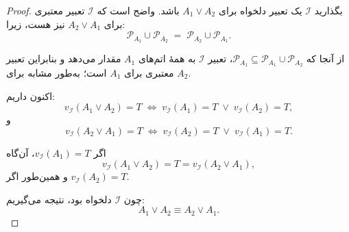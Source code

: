     \begin{proof}
      بگذارید $\mathscr{I}$ یک تعبیر دلخواه برای $A_1 \lor A_2$ باشد. واضح است که $\mathscr{I}$ تعبیر معتبری برای $A_2 \lor A_1$ نیز هست، زیرا:
      \[
      \mathscr{P}_{A_1} \cup \mathscr{P}_{A_2} \;=\; \mathscr{P}_{A_2} \cup \mathscr{P}_{A_1}.
      \]
      
      از آنجا که $\mathscr{P}_{A_1} \subseteq \mathscr{P}_{A_1} \cup \mathscr{P}_{A_2}$، تعبیر $\mathscr{I}$ به همهٔ اتم‌های $A_1$ مقدار می‌دهد و بنابراین تعبیر معتبری برای $A_1$ است؛ به‌طور مشابه برای $A_2$.
      
      اکنون داریم:
      \[
      v_{\mathscr{I}}(A_1 \lor A_2) = T
      \;\Longleftrightarrow\;
      v_{\mathscr{I}}(A_1) = T \;\lor\; v_{\mathscr{I}}(A_2) = T,
      \]
      و
      \[
      v_{\mathscr{I}}(A_2 \lor A_1) = T
      \;\Longleftrightarrow\;
      v_{\mathscr{I}}(A_2) = T \;\lor\; v_{\mathscr{I}}(A_1) = T.
      \]
      
      اگر $v_{\mathscr{I}}(A_1) = T$، آن‌گاه
      \[
      v_{\mathscr{I}}(A_1 \lor A_2) = T = v_{\mathscr{I}}(A_2 \lor A_1),
      \]
      و همین‌طور اگر $v_{\mathscr{I}}(A_2) = T$.
      
      چون $\mathscr{I}$ دلخواه بود، نتیجه می‌گیریم:
      \[
      A_1 \lor A_2 \equiv A_2 \lor A_1.
      \]
    \end{proof}



